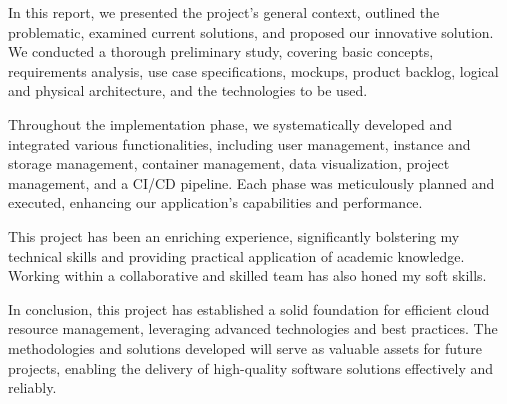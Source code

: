 In this report, we presented the project's general context, outlined the problematic, examined current solutions, and proposed our innovative solution. We conducted a thorough preliminary study, covering basic concepts, requirements analysis, use case specifications, mockups, product backlog, logical and physical architecture, and the technologies to be used.

Throughout the implementation phase, we systematically developed and integrated various functionalities, including user management, instance and storage management, container management, data visualization, project management, and a CI/CD pipeline. Each phase was meticulously planned and executed, enhancing our application's capabilities and performance.

This project has been an enriching experience, significantly bolstering my technical skills and providing practical application of academic knowledge. Working within a collaborative and skilled team has also honed my soft skills.

In conclusion, this project has established a solid foundation for efficient cloud resource management, leveraging advanced technologies and best practices. The methodologies and solutions developed will serve as valuable assets for future projects, enabling the delivery of high-quality software solutions effectively and reliably.